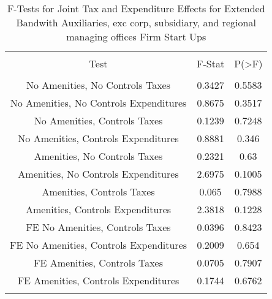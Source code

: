 
\begin{table}[!htbp] \centering 
  \caption{F-Tests for Joint Tax and Expenditure Effects for Extended Bandwith Auxiliaries, exc corp, subsidiary, and regional managing offices Firm Start Ups} 
  \label{95Ftests} 
\begin{tabular}{@{\extracolsep{5pt}} ccc} 
\\[-1.8ex]\hline 
\hline \\[-1.8ex] 
Test & F-Stat & P(\textgreater F) \\ 
\hline \\[-1.8ex] 
No Amenities, No Controls Taxes & 0.3427 & 0.5583 \\ 
No Amenities, No Controls Expenditures & 0.8675 & 0.3517 \\ 
No Amenities, Controls Taxes & 0.1239 & 0.7248 \\ 
No Amenities, Controls Expenditures & 0.8881 & 0.346 \\ 
Amenities, No Controls Taxes & 0.2321 & 0.63 \\ 
Amenities, No Controls Expenditures & 2.6975 & 0.1005 \\ 
Amenities, Controls Taxes & 0.065 & 0.7988 \\ 
Amenities, Controls Expenditures & 2.3818 & 0.1228 \\ 
FE No Amenities, Controls Taxes & 0.0396 & 0.8423 \\ 
FE No Amenities, Controls Expenditures & 0.2009 & 0.654 \\ 
FE Amenities, Controls Taxes & 0.0705 & 0.7907 \\ 
FE Amenities, Controls Expenditures & 0.1744 & 0.6762 \\ 
\hline \\[-1.8ex] 
\end{tabular} 
\end{table} 
